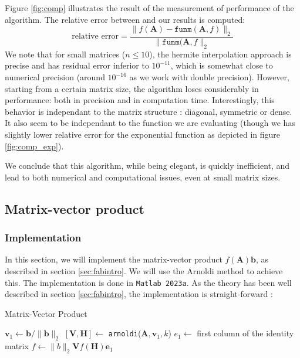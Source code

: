 \documentclass[11pt]{article}
\numberwithin{equation}{section}
\begin{document}
Figure \ref{fig:comp} illustrates the result of the measurement of performance of the algorithm. The relative error between \cite{davies2003schur} and our results is computed:
\begin{equation*}
    \text{relative error} = \frac{\|f(\mathbf{A})-\texttt{funm}(\mathbf{A},f)\|_2}{\|\texttt{funm}(\mathbf{A},f\|_2}
\end{equation*}
We note that for small matrices ($n\leq 10$), the hermite interpolation approach is precise and has residual error inferior to $10^{-11}$, which is somewhat close to numerical precision (around $10^{-16}$ as we work with double precision). However, starting from a certain matrix size, the algorithm loses considerably in performance: both in precision and in computation time. Interestingly, this behavior is independant to the matrix structure : diagonal, symmetric or dense. It also seem to be independant to the function we are evaluating (though we has slightly lower relative error for the exponential function as depicted in figure \ref{fig:comp_exp}).

We conclude that this algorithm, while being elegant, is quickly inefficient, and lead to both numerical and computational issues, even at small matrix sizes.

\subsection{Matrix-vector product}
\subsubsection{Implementation}
In this section, we will implement the matrix-vector product $f(\mathbf{A})\mathbf{b}$, as described in section \ref{sec:fabintro}. We will use the Arnoldi method to achieve this. The implementation is done in \texttt{Matlab 2023a}. As the theory has been well described in section \ref{sec:fabintro}, the implementation is straight-forward :
\begin{algorithm2e}
    \SetAlgoLined
    \caption{Matrix-Vector Product}
    $\mathbf{v}_1 \gets \mathbf{b}/\|\mathbf{b}\|_2$\;
    $[\mathbf{V},\mathbf{H}] \gets$ \texttt{arnoldi}($\mathbf{A},\mathbf{v}_1,k$)\;
    $e_1 \gets$ first column of the identity matrix\;
    $f \gets \|b\|_2\mathbf{V}f(\mathbf{H})\mathbf{e}_1$\;
\end{algorithm2e}
\end{document}
